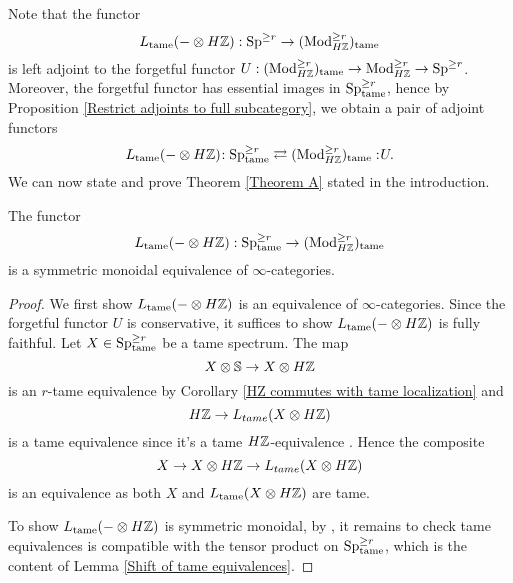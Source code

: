 Note that the functor 
$$
L_{\operatorname{\operatorname{tame}}}(-\otimes H{\mathbb{Z}}): \operatorname{Sp}^{\geq r} \to 
(\operatorname{Mod}^{\geq r}_{H{\mathbb{Z}}})_{\operatorname{\operatorname{tame}}}
$$
is left adjoint to the forgetful functor $U: (\operatorname{Mod}^{\geq r}_{H{\mathbb{Z}}})_{\operatorname{\operatorname{tame}}} \to \operatorname{Mod}^{\geq r}_{H{\mathbb{Z}}}
\to \operatorname{Sp}^{\geq r}
$. Moreover, the forgetful functor has essential images in $\operatorname{Sp}^{\geq r}_{\operatorname{\operatorname{tame}}}$, hence by Proposition \ref{Restrict adjoints to full subcategory},
we obtain a pair of adjoint functors
\[
L_{\operatorname{\operatorname{tame}}}(-\otimes H{\mathbb{Z}})\negmedspace: \operatorname{Sp}^{\geq r}_{\operatorname{\operatorname{tame}}}\rightleftarrows (\operatorname{Mod}^{\geq r}_{H{\mathbb{Z}}})_{\operatorname{\operatorname{tame}}}:\negmedspace U.
\]
We can now state and prove Theorem \ref{Theorem A} stated in the introduction.
\begin{theorem}
	\label{algebraic description of tame spectra}
	The functor
	$$
	L_{\operatorname{\operatorname{tame}}}(-\otimes H{\mathbb{Z}}):
	\operatorname{Sp}^{\geq r}_{\operatorname{\operatorname{tame}}} \to (\operatorname{Mod}^{\geq r}_{H{\mathbb{Z}}})_{\operatorname{\operatorname{tame}}}
	$$
	is a symmetric monoidal equivalence of $\infty$-categories.
\end{theorem}
\begin{proof}
    We first show $L_{\operatorname{\operatorname{tame}}}(-\otimes H{\mathbb{Z}})$ is an equivalence of $\infty$-categories.
    Since the forgetful functor $U$ is conservative, it suffices to show $L_{\operatorname{\operatorname{tame}}}(-\otimes H{\mathbb{Z}})$ is fully faithful.
	Let $X\in \operatorname{Sp}^{\geq r}_{\operatorname{\operatorname{tame}}}$ be a tame spectrum. The map 
	$$
	X\otimes {\mathbb{S}} \to X\otimes H{\mathbb{Z}}
	$$ is an $r$-tame equivalence by Corollary \ref{HZ commutes with tame localization}
	and 
	$$
	H{\mathbb{Z}} \to L_{tame}(X\otimes H{\mathbb{Z}})
	$$
	is a tame equivalence since it's a tame $H{\mathbb{Z}}$-equivalence
	. 
	Hence the composite 
	$$
	X \to X\otimes H{\mathbb{Z}} \to L_{tame}(X\otimes H{\mathbb{Z}})
	$$ is an equivalence as both $X$ and $L_{\operatorname{\operatorname{tame}}}(X\otimes H{\mathbb{Z}})$ are tame.
	
	To show $L_{\operatorname{\operatorname{tame}}}(-\otimes H{\mathbb{Z}})$ is symmetric monoidal, by \cite[Proposition 2.2.1.9.]{HA}, it remains to check tame equivalences is compatible with the tensor product on $\operatorname{Sp}^{\geq r}_{\operatorname{\operatorname{tame}}}$, which is the content of Lemma \ref{Shift of tame equivalences}.
	
	
	
	\end{proof}
	

